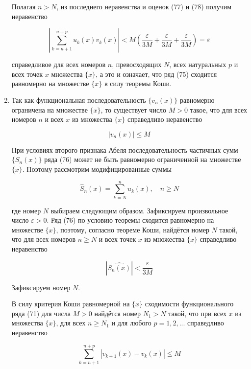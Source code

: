 \begin{enumerate}
	Полагая $n > N$, из последнего неравенства и оценок (77) и (78) получим неравенство
	
	\begin{equation*}
		\left| \displaystyle\sum_{k = n + 1}^{n + p} u_k(x)v_k(x) \right| < M\left( \frac{\varepsilon}{3M} + \frac{\varepsilon}{3M} + \frac{\varepsilon}{3M} \right) = \varepsilon
	\end{equation*}
	
	справедливое для всех номеров $n$, превосходящих $N$, всех натуральных $p$ и всех точек $x$ множества $\{x\}$, а это и означает, что ряд (75) сходится равномерно на множестве $\{x\}$ в силу теоремы Коши.
	
	\item Так как функциональная последовательность $\{v_n(x)\}$ равномерно ограничена на множестве $\{x\}$, то существует число $M > 0$ такое, что для всех номеров $n$ и всех $x$ из множества $\{x\}$ справедливо неравенство
	
	\begin{equation}
		|v_n(x)| \leqslant M
	\end{equation}
	
	При условиях второго признака Абеля последовательность частичных сумм $\{S_n(x)\}$ ряда (76) может не быть равномерно ограниченной на множестве $\{x\}$. Поэтому рассмотрим модифицированные суммы
	
	\begin{equation*}
		\hat{S}_n(x) = \displaystyle\sum_{k = N}^n u_k(x),\quad n \geqslant N
	\end{equation*}
	
	где номер $N$ выбираем следующим образом. Зафиксируем произвольное число $\varepsilon > 0$. Ряд (76) по условию теоремы сходится равномерно на множестве $\{x\}$, поэтому, согласно теореме Коши, найдётся номер $N$ такой, что для всех номеров $n \geqslant N$ и всех точек $x$ из множества $\{x\}$ справедливо неравенство
	
	\begin{equation}
		\left| \hat{S_n(x)} \right| < \frac{\varepsilon}{3M}
	\end{equation}
	
	Зафиксируем номер $N$.
	
	В силу критерия Коши равномерной на $\{x\}$ сходимости функционального ряда (71) для числа $M > 0$ найдётся номер $N_1 > N$ такой, что при всех $x$ из множества $\{x\}$, для всех $n \geqslant N_1$ и для любого $p = 1, 2, ...$ справедливо неравенство
	
	\begin{equation}
		\displaystyle\sum_{k = n + 1}^{n + p} |v_{k + 1}(x) - v_k(x)| \leqslant M
	\end{equation}
	

\end{enumerate}
